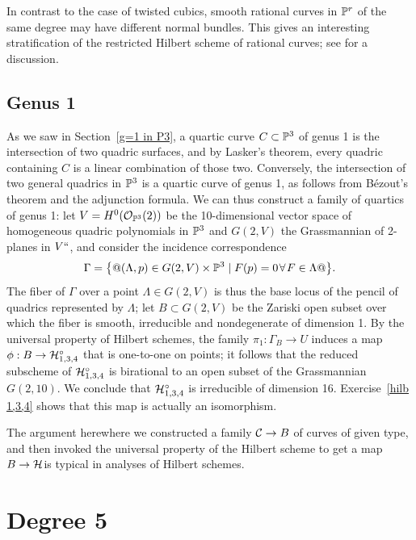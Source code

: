 In contrast to the case of twisted cubics, smooth rational curves in
${\mathbb P}^r$ of the same degree may have different normal bundles. This gives
an interesting stratification of the restricted Hilbert scheme of rational
%
%
curves; see \cite{MR3778979} for a discussion.

\subsection*{Genus 1}
 As we saw in Section~\ref{g=1 in P3}, a quartic curve $C \subset {\mathbb P}^3$
 of genus 1 is the intersection of two quadric surfaces, and by Lasker's
%
 theorem, every quadric containing $C$ is a linear combination of those
 two. Conversely, the intersection of two general quadrics in ${\mathbb P}^3$ is
 a quartic curve of genus 1, as follows from B\'ezout's theorem
%
and the
 adjunction formula. We
%
can thus construct a family of quartics of genus
 1: let $V = H^0({\mathcal O}_{{\mathbb P}^3}(2))$ be the 10-dimensional vector space of
 homogeneous quadric polynomials in ${\mathbb P}^3$ and $G(2,V)$ the
Grassmannian of 2-planes
%
in $V` `$, and consider the
incidence correspondence
%
$$
\Gamma = \bigl\{@(\Lambda, p) \in G(2,V) \times \PP^3 \mid F(p)=0 \; \forall \;
F \in \Lambda@\bigr\}.
$$
The fiber of $\Gamma$ over a point $\Lambda \in G(2,V)$ is thus the
base locus of the pencil of quadrics represented by $\Lambda$; let $B
\subset G(2,V)$ be the Zariski open subset over which the fiber is smooth,
irreducible and nondegenerate of dimension 1. By the universal property of
Hilbert schemes, the family $\pi_1 : \Gamma_B \to U$ induces a map $\phi :
B \to \mathcal H^\circ_{1,3,4}$ that is one-to-one on points; it follows that the
%
reduced subscheme of $\mathcal H^\circ_{1,3,4}$ is birational to an open subset
of the Grassmannian $G(2,10)$. We conclude that $\mathcal H^\circ_{1,3,4}$
is irreducible of dimension 16. Exercise~\ref{hilb 1,3,4} shows that
this map is actually an isomorphism.

The  argument  here\emdash where we constructed a family $\mathcal C \to B$ of
curves of given type, and then invoked the universal property of the
Hilbert scheme to get a map $B \to \mathcal H$\emdash is typical in analyses of
Hilbert schemes.

\section{Degree 5}

